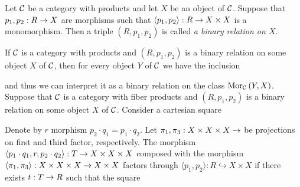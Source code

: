 \begin{definition}
Let ${\mathcal C}$ be a category with products and let $X$ be an object of ${\mathcal C}$. Suppose that $p_1,p_2:R\rightarrow X$ are morphisms such that $\langle p_1, p_2\rangle:R\rightarrow X\times X$ is a monomorphism. Then a triple $(R,p_1,p_2)$ is called \textit{a binary relation on $X$}.
\end{definition}
\noindent
If ${\mathcal C}$ is a category with products and $(R,p_1,p_2)$ is a binary relation on some object $X$ of ${\mathcal C}$, then for every object $Y$ of ${\mathcal C}$ we have the inclusion
\begin{center}
\end{center}
and thus we can interpret it as a binary relation on the class $\mathrm{Mor}_{{\mathcal C}}\left(Y,X\right)$.\\
Suppose that ${\mathcal C}$ is a category with fiber products and $(R,p_1,p_2)$ is a binary relation on some object $X$ of ${\mathcal C}$. Consider a cartesian square
\begin{center}
\end{center}
Denote by $r$ morphism $p_2\cdot q_1 = p_1\cdot q_2$. Let $\pi_1,\pi_3:X\times X\times X\rightarrow $ be projections on first and third factor, respectively. The morphism $\langle p_1\cdot q_1, r, p_2\cdot q_2\rangle:T\rightarrow X\times X \times X$ composed with the morphism $\langle \pi_1,\pi_3\rangle:X\times X\times X\rightarrow X\times X$ factors through $\langle p_1,p_2\rangle:R\hookrightarrow X\times X$ if there exists $t:T\rightarrow R$ such that the square

